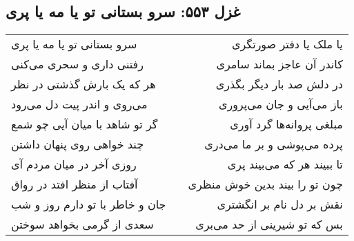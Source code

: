\begin{center}
\section*{غزل ۵۵۳: سرو بستانی تو یا مه یا پری}
\label{sec:553}
\begin{longtable}{l p{0.5cm} r}
سرو بستانی تو یا مه یا پری
&&
یا ملک یا دفتر صورتگری
\\
رفتنی داری و سحری می‌کنی
&&
کاندر آن عاجز بماند سامری
\\
هر که یک بارش گذشتی در نظر
&&
در دلش صد بار دیگر بگذری
\\
می‌روی و اندر پیت دل می‌رود
&&
باز می‌آیی و جان می‌پروری
\\
گر تو شاهد با میان آیی چو شمع
&&
مبلغی پروانه‌ها گرد آوری
\\
چند خواهی روی پنهان داشتن
&&
پرده می‌پوشی و بر ما می‌دری
\\
روزی آخر در میان مردم آی
&&
تا ببیند هر که می‌بیند پری
\\
آفتاب از منظر افتد در رواق
&&
چون تو را بیند بدین خوش منظری
\\
جان و خاطر با تو دارم روز و شب
&&
نقش بر دل نام بر انگشتری
\\
سعدی از گرمی بخواهد سوختن
&&
بس که تو شیرینی از حد می‌بری
\\
\end{longtable}
\end{center}
